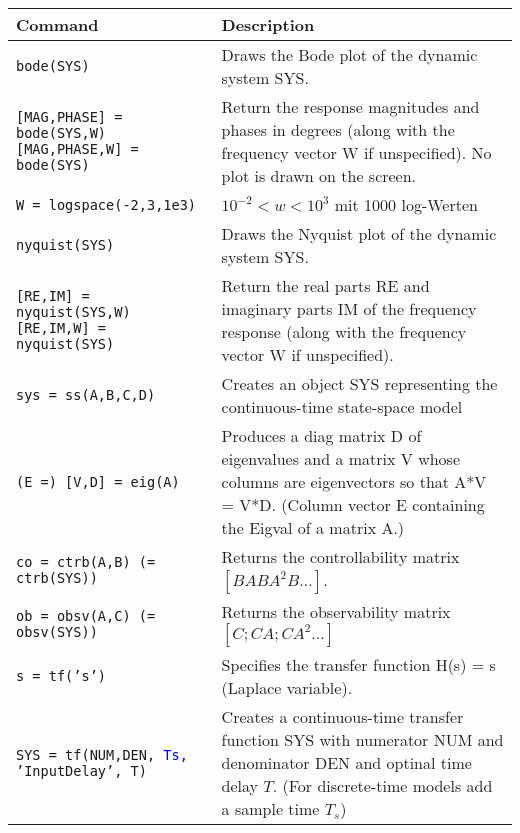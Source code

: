 \begin{center}
    {\def\arraystretch{1.4}
    \begin{tabular}{p{5cm}|p{8.5cm}}
        \textbf{Command}    &   \textbf{Description}\\
        \hline
        \texttt{bode(SYS)}  &  Draws the Bode plot of the dynamic system SYS.\\
        
        \texttt{[MAG,PHASE] = bode(SYS,W) [MAG,PHASE,W] = bode(SYS)} & Return the response magnitudes and phases in degrees (along with the frequency vector W if unspecified).  No plot is drawn on the screen. \\
        
        \texttt{W = logspace(-2,3,1e3)} & $10^{-2} < w < 10^3$ mit 1000 log-Werten\\
        
        \texttt{nyquist(SYS)}  &  Draws the Nyquist plot of the dynamic system SYS. \\
        
        \texttt{[RE,IM] = nyquist(SYS,W) [RE,IM,W] = nyquist(SYS)} & Return the real parts RE and imaginary parts IM of the frequency response (along with the frequency vector W if unspecified).\\
        
        \texttt{sys = ss(A,B,C,D)}  & Creates an object SYS representing the continuous-time state-space model \\
        
        \texttt{(E =) [V,D] = eig(A)}  &  Produces a diag matrix D of eigenvalues and a matrix V whose columns are eigenvectors so that A*V = V*D. (Column vector E containing the Eigval of a matrix A.)\\
        
        \texttt{co = ctrb(A,B) (= ctrb(SYS))}  & Returns the controllability matrix $[B AB A^2B ...]$.  \\
        
        \texttt{ob = obsv(A,C) (= obsv(SYS))}  & Returns the observability matrix $[C; CA; CA^2 ...]$ \\
        
        \texttt{s = tf('s')}  & Specifies the transfer function H(s) = s (Laplace variable). \\
        
        \texttt{SYS = tf(NUM,DEN, \textcolor{blue}{Ts}, 'InputDelay', T)} & Creates a continuous-time transfer function SYS with numerator NUM and denominator DEN and optinal time delay $T$. (For discrete-time models add a sample time $T_s$)\\
        

\end{tabular}}
\end{center}

